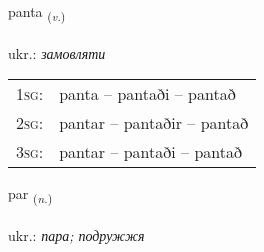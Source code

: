 \documentclass[frontgrid, backgrid]{flacards}\usepackage[]{graphicx}\usepackage[]{xcolor}
\begin{document}
\renewcommand{\flhead}{\vskip5pt \fboxsep=0pt {\small\bfseries\footnotesize Sagnorð | дієслово}}
\renewcommand{\fcfoot}{\vskip5pt \fboxsep=0pt \hspace{2pt}{\small\bfseries\footnotesize 2K}}

\renewcommand{\blhead}{\vskip5pt {\small\bfseries\footnotesize Sagnorð | дієслово }}
\renewcommand{\bcfoot}{\vskip5pt \hspace{2pt}{\small\bfseries\footnotesize 2K}}


{panta \small{\textsubscript{(\textit{v.})}} \\[1ex] %
\textphonetic{[pʰan̥ta]} \\
ukr.: \emph{замовляти} \\  [2ex]
\renewcommand*{\arraystretch}{0.8}
\begin{tabular}{p{1cm}l}
\textsc{1sg}: & panta -- pantaði -- pantað \\ 
\textsc{2sg}: & pantar -- pantaðir -- pantað \\ 
\textsc{3sg}: & pantar -- pantaði -- pantað \\ 
\end{tabular}
}

\renewcommand{\flhead}{\vskip5pt \fboxsep=0pt {\small\bfseries\footnotesize Nafnorð | іменник}}
\renewcommand{\fcfoot}{\vskip5pt \fboxsep=0pt \hspace{2pt}{\small\bfseries\footnotesize 2K}}

\renewcommand{\blhead}{\vskip5pt {\small\bfseries\footnotesize Nafnorð | іменник }}
\renewcommand{\bcfoot}{\vskip5pt \hspace{2pt}{\small\bfseries\footnotesize 2K}}


{par \small{\textsubscript{(\textit{n.})}} \\[1ex] %
\textphonetic{[pʰaːr]} \\
ukr.: \emph{пара; подружжя} \\  [2ex]
\renewcommand*{\arraystretch}{0.8}
}
\end{document}
